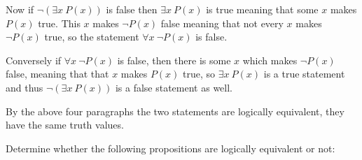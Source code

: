 \documentclass[addpoints]{exam}
\begin{document}
\begin{questions}
\begin{parts}
\begin{solution}
      Now if $\neg(\exists x \ P(x))$ is false then $\exists x \ P(x)$ is true
      meaning that some $x$ makes $P(x)$ true. This $x$ makes $\neg P(x)$ false
      meaning that not every $x$ makes $\neg P(x)$ true, so the statement
      $\forall x \ \neg P(x)$ is false.
      
      Conversely if $\forall x \ \neg P(x)$ is false, then there is some $x$
      which makes $\neg P(x)$ false, meaning that that $x$ makes $P(x)$ true, so
      $\exists x \ P(x)$ is a true statement and thus $\neg (\exists x \ P(x))$
      is a false statement as well.

      By the above four paragraphs the two statements are logically equivalent,
      they have the same truth values.
    \end{solution}

  \end{parts}

  \question[10] Determine whether the following propositions are logically
  equivalent or not:
\end{questions}
\end{document}
